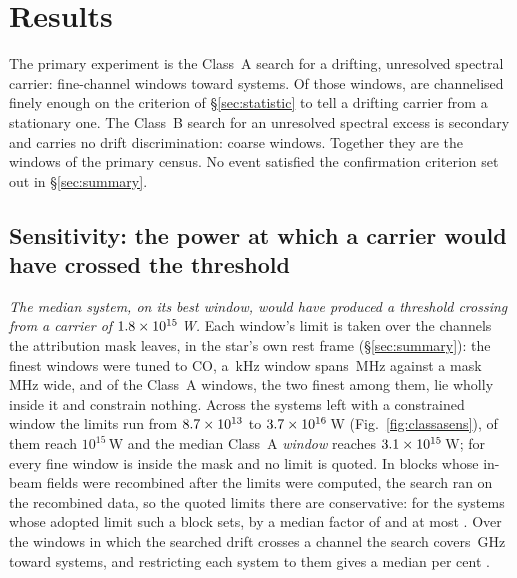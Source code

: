 \section{Results}
\label{sec:results}

The primary experiment is the Class~A search for a drifting, unresolved
spectral carrier: \NWinA{} fine-channel windows toward \NSysClassA{} systems.
Of those windows, \EdrNWinA{} are channelised finely enough on the criterion of
\S\ref{sec:statistic} to tell a drifting carrier from a stationary one. The
Class~B search for an unresolved spectral excess is secondary and carries no
drift discrimination: \NWinB{} coarse windows. Together they are the
\NWindows{} windows of the primary census. No event satisfied the confirmation
criterion set out in \S\ref{sec:summary}.

\subsection{Sensitivity: the power at which a carrier would have crossed
the threshold} \label{sec:pninetysel}

\emph{The median system, on its best window, would have produced a threshold
crossing from a carrier of $1.8\times10^{15}$\,W.} Each window's limit is
taken over the channels the attribution mask leaves, in the star's own rest
frame (\S\ref{sec:summary}): the finest windows were tuned to CO, a
\UmFineChanKHz\,kHz window spans \UmFineBwMHz\,MHz against a mask
\UmFineMaskMHz\,MHz wide, and \UmNWinAFull{} of the \NWinA{} Class~A windows,
the two finest among them, lie wholly inside it and constrain nothing. Across
the \NSysALim{} systems left with a constrained window the limits run from
$8.7\times10^{13}$ to $3.7\times10^{16}$\,W (Fig.~\ref{fig:classasens}),
\NSysEfifteen{} of them reach $10^{15}$\,W and the median Class~A
\emph{window} reaches $3.1\times10^{15}$\,W; for \NSysALostName{} every fine
window is inside the mask and no limit is quoted. In \FcNBlock{} blocks whose
in-beam fields were recombined after the limits were computed, the search ran on
the recombined data, so the quoted limits there are conservative: for the
\FcNSys{} systems whose adopted limit such a block sets, by a median factor of
\FcMedFactor{} and at most \FcMaxFactor{}. Over the \EdrNWinA{} windows
in which the searched drift crosses a channel the search covers
\EdrUnionGHz\,GHz toward \EdrNSys{} systems, and restricting each
system to them gives a median \ScEdrMedPct{} per cent \ScEdrMedSense{}.

